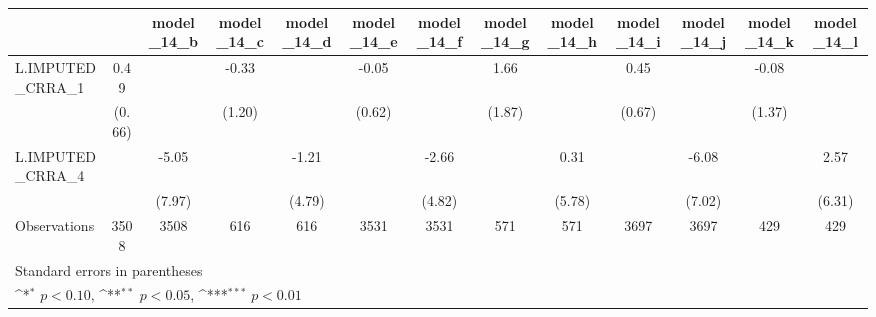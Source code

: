 {
\def\sym#1{\ifmmode^{#1}\else\(^{#1}\)\fi}
\begin{tabular}{l*{12}{c}}
\toprule
                &\multicolumn{1}{c}{}&\multicolumn{1}{c}{model\_14\_b}&\multicolumn{1}{c}{model\_14\_c}&\multicolumn{1}{c}{model\_14\_d}&\multicolumn{1}{c}{model\_14\_e}&\multicolumn{1}{c}{model\_14\_f}&\multicolumn{1}{c}{model\_14\_g}&\multicolumn{1}{c}{model\_14\_h}&\multicolumn{1}{c}{model\_14\_i}&\multicolumn{1}{c}{model\_14\_j}&\multicolumn{1}{c}{model\_14\_k}&\multicolumn{1}{c}{model\_14\_l}\\
\midrule
L.IMPUTED\_CRRA\_1&     0.49         &                  &    -0.33         &                  &    -0.05         &                  &     1.66         &                  &     0.45         &                  &    -0.08         &                  \\
                &   (0.66)         &                  &   (1.20)         &                  &   (0.62)         &                  &   (1.87)         &                  &   (0.67)         &                  &   (1.37)         &                  \\
\addlinespace
L.IMPUTED\_CRRA\_4&                  &    -5.05         &                  &    -1.21         &                  &    -2.66         &                  &     0.31         &                  &    -6.08         &                  &     2.57         \\
                &                  &   (7.97)         &                  &   (4.79)         &                  &   (4.82)         &                  &   (5.78)         &                  &   (7.02)         &                  &   (6.31)         \\
\midrule
Observations    &     3508         &     3508         &      616         &      616         &     3531         &     3531         &      571         &      571         &     3697         &     3697         &      429         &      429         \\
\bottomrule
\multicolumn{13}{l}{\footnotesize Standard errors in parentheses}\\
\multicolumn{13}{l}{\footnotesize \sym{*} \(p<0.10\), \sym{**} \(p<0.05\), \sym{***} \(p<0.01\)}\\
\end{tabular}
}
